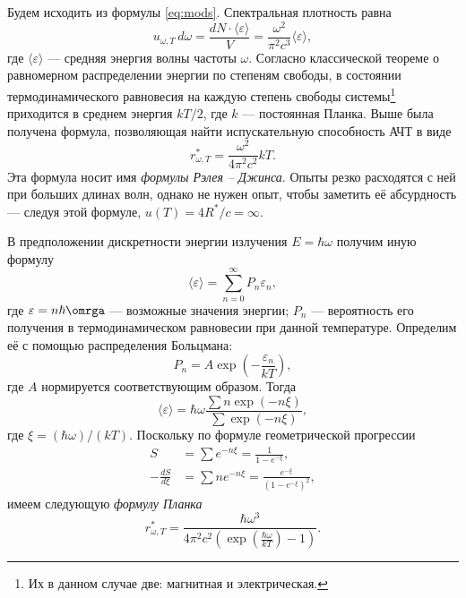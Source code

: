 Будем исходить из формулы \eqref{eq:mods}. Спектральная плотность равна
\[
  u_{\omega, T}\,d\omega = \frac{dN\cdot\langle \varepsilon \rangle}{V} =
  \frac{\omega^2}{\pi^2 c^3}\langle \varepsilon \rangle,
\]
где $ \langle \varepsilon \rangle $ --- средняя энергия волны частоты $ \omega
$. Согласно классической теореме о равномерном распределении энергии по степеням
свободы, в состоянии термодинамического равновесия на каждую степень свободы
системы\footnote{Их в данном случае две: магнитная и электрическая.} приходится
в среднем энергия $ kT/2 $, где $ k $ --- постоянная Планка. Выше была получена
формула, позволяющая найти испускательную способность АЧТ в виде 
\[
  r^\ast_{\omega, T} = \frac{\omega^2}{4\pi^2 c^2}kT.
\]
Эта формула носит имя \emph{формулы Рэлея -- Джинса}. Опыты резко расходятся с ней
при больших длинах волн, однако не нужен опыт, чтобы заметить её абсурдность ---
следуя этой формуле, $ u(T) = 4R^\ast/c = \infty $.

В предположении дискретности энергии излучения $ E = \hbar \omega $ получим иную
формулу 
\[
  \langle \varepsilon \rangle = \sum_{n=0}^\infty P_n\varepsilon_n,
\]
где $ \varepsilon = n\hbar\omrga $ --- возможные значения энергии; $ P_n $ ---
вероятность его получения в термодинамическом равновесии при данной температуре.
Определим её с помощью распределения Больцмана: 
\[
    P_n = A\exp \left( - \frac{\varepsilon_n}{kT} \right),
\]
где $ A $ нормируется соответствующим образом. Тогда 
\[
  \langle\varepsilon\rangle = \hbar \omega \frac{\sum n \exp(-n\xi)}{\sum
  \exp(-n\xi)},
\]
где $ \xi = (\hbar\omega)/(kT) $.
Поскольку по формуле геометрической прогрессии 
\begin{align*}
  S &= \sum e^{-n\xi} = \frac{1}{1 - e^{-\xi}},\\
  -\frac{dS}{d\xi} &= \sum ne^{-n\xi}=\frac{e^{-\xi}}{(1-e^{-\xi})^2},
\end{align*}
имеем следующую \emph{формулу Планка} 
\[
  r^\ast_{\omega, T} =
\frac{\hbar\omega^3}{4\pi^2c^2(\exp\left(\frac{\hbar\omega}{kT}\right)-1)}.
\]

